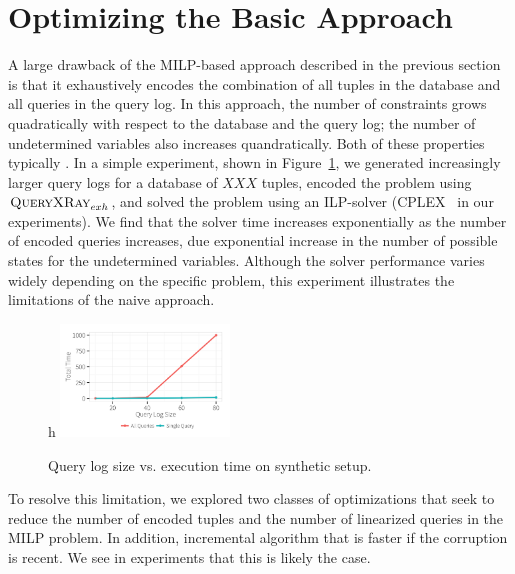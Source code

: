 \section{Optimizing the Basic Approach}
\label{sec:opt}

A large drawback of the MILP-based approach described in the previous section is
that it exhaustively encodes the combination of all tuples in the database and all queries
in the query log.  In this approach, the number of constraints grows quadratically with respect to
the database and the query log; the number of undetermined variables also increases quandratically.
Both of these properties typically .
In a simple experiment, shown in Figure~\ref{fig:querysize_vs_time}, we generated increasingly 
larger query logs for a database of $XXX$ tuples, encoded the problem using $\textsc{QueryXRay}_{exh}$, and solved
the problem using an ILP-solver (CPLEX~\cite{cplex} in our experiments).
We find that the solver time increases exponentially as the number of encoded queries increases,
due exponential increase in the number of possible states for the undetermined variables.
Although the solver performance varies widely depending on the specific problem, this experiment 
illustrates the limitations of the naive approach.

\begin{figure}{h}
    \centering
        \includegraphics[width=0.4\textwidth]{figures/qsize_time_badscale}
    \caption{Query log size vs. execution time on synthetic setup. }
    \label{fig:querysize_vs_time}
\end{figure}

To resolve this limitation, we explored two classes of optimizations that seek to
reduce the number of encoded tuples and the number of linearized queries in the MILP problem.
In addition, incremental algorithm that is faster if the corruption is recent.  
We see in experiments that this is likely the case.






